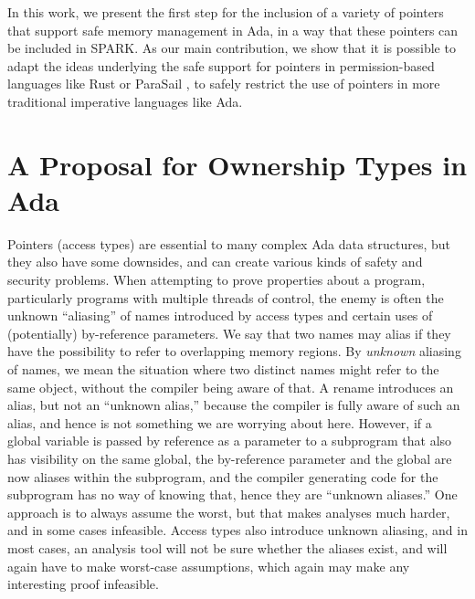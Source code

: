 \documentclass{llncs}
\begin{document}
In this work, we present the first step for the inclusion of a variety of pointers that support safe memory management in Ada, in a way that these pointers can be included in SPARK. As our main contribution, we show that it is possible to adapt the ideas underlying the safe support for pointers in permission-based languages like Rust \cite{Balasubramanian17} or ParaSail \cite{Taft11}, to safely restrict the use of pointers in more traditional imperative languages like Ada. 


\section{A Proposal for Ownership Types in Ada}
Pointers (access types) are essential to many complex Ada data structures, but they also have some downsides, and can create various kinds of safety and security problems.
When attempting to prove properties about a program, particularly programs with multiple threads of control, the enemy is often the unknown ``aliasing'' of names introduced by
access types and certain uses of (potentially) by-reference parameters. We say that two names may alias if they have the possibility to refer to overlapping memory regions.
By \textit{unknown} aliasing of names, we mean the situation where two distinct names might refer to the same object, without the compiler being aware of that.  A rename introduces
an alias, but not an ``unknown alias,'' because the compiler is fully aware of such an alias, and hence is not something we are worrying about here. However, if a global
variable is passed by reference as a parameter to a subprogram that also has visibility on the same global, the by-reference parameter and the global are now aliases within
the subprogram, and the compiler generating code for the subprogram has no way of knowing that, hence they are ``unknown aliases.''  One approach is to always assume the worst,
but that makes analyses much harder, and in some cases infeasible. Access types also introduce unknown aliasing, and in most cases, an analysis tool will not be
sure whether the aliases exist, and will again have to make worst-case assumptions, which again may make any interesting proof infeasible.
\end{document}
